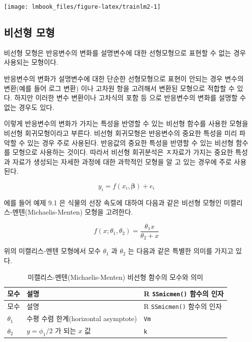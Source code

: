 \documentclass[
  10pt,
]{book}
\theoremstyle{definition}
\theoremstyle{definition}
\theoremstyle{definition}
\theoremstyle{definition}
\theoremstyle{remark}
\begin{document}
\begin{center}\texttt{[image: lmbook\_files/figure-latex/trainlm2-1]} \end{center}

\hypertarget{uxbe44uxc120uxd615-uxbaa8uxd615}{%
\subsection{비선형 모형}\label{uxbe44uxc120uxd615-uxbaa8uxd615}}

비선형 모형은 반응변수의 변화를 설명변수에 대한 선형모형으로 표현할 수 없는 경우 사용되는 모형이다.

반응변수의 변화가 설명변수에 대한 단순한 선형모형으로 표현이 안되는 경우 변수의 변환(예를 들어 로그 변환) 이나 고차원 항을 고려해서 변환된 모형으로 적합할 수 있다. 하지만 이러한 변수 변환이나 고차식의 포함 등 으로 반응변수의 변화를 설명할 수 없는 경우도 있다.

이렇게 반응변수의 변화가 가지는 특성을 반영할 수 있는 비선형 함수를 사용한 모형을 비선형 회귀모형이라고 부른다.
비선형 회귀모형은 반응변수의 중요한 특성을 미리 파악할 수 있는 경우 주로 사용된다. 반응값의 중요한 특성을 반영할 수 있는 비선형 함수를 모형으로 사용하는 것이다. 따라서 비선형 회귀분석은 ㅈ자료가 가지는 중요한 특성과 자료가 생성되는 자세한 과정에 대한 과학적인 모형을 알 고 있는 경우에 주로 사용된다.

\begin{equation}
y_i = f(x_i, \bm \beta) + e_i
\label{eq:nonlinear1}
\end{equation}

에를 들어 \citet{kang2016you} 예제 9.1 은 식물의 선장 속도에 대하여 다음과 같은 비선형 모형인 미캘리스-멘텐(Michaelis-Menten)
모형을 고려한다.

\[ f(x; \theta_1, \theta_2) = \frac{\theta_1 x}{\theta_2 + x} \]

위의 미캘리스-멘텐 모형에서 모수 \(\theta_1\) 과 \(\theta_2\) 는 다음과 같은 특별한 의미를 가지고 있다.

\begin{longtable}[]{@{}lll@{}}
\caption{\label{tab:micmen} 미캘리스-멘텐(Michaelis-Menten) 비선형 함수의 모수와 의미}\tabularnewline
\toprule
모수 & 설명 & R \texttt{SSmicmen()} 함수의 인자\tabularnewline
\midrule
\endfirsthead
\toprule
모수 & 설명 & R \texttt{SSmicmen()} 함수의 인자\tabularnewline
\midrule
\endhead
\(\theta_1\) & 수평 수렴 한계(horizontal asymptote) & \texttt{Vm}\tabularnewline
\(\theta_2\) & \(y=\phi_1 /2\) 가 되는 \(x\) 값 & \texttt{k}\tabularnewline
\bottomrule
\end{longtable}
\end{document}
